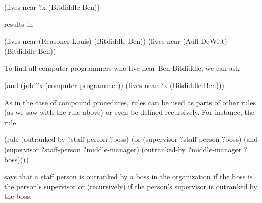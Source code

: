\begin{codeBlock}
(lives-near ?x (Bitdiddle Ben))
\end{codeBlock}

\noindent
results in

\begin{codeBlock}
(lives-near (Reasoner Louis) (Bitdiddle Ben))
(lives-near (Aull DeWitt) (Bitdiddle Ben))
\end{codeBlock}

\noindent
To find all computer programmers who live near Ben Bitdiddle, we can ask

\begin{codeBlock}
(and (job ?x (computer programmer))
     (lives-near ?x (Bitdiddle Ben)))
\end{codeBlock}

\noindent
As in the case of compound procedures, rules can be used as parts of other
rules (as we saw with the  rule above) or even be defined
recursively.  For instance, the rule

\begin{codeBlock}
(rule (outranked-by ?staff-person ?boss)
      (or (supervisor ?staff-person ?boss)
          (and (supervisor ?staff-person ?middle-manager)
               (outranked-by ?middle-manager ?boss))))
\end{codeBlock}

\noindent
says that a staff person is outranked by a boss in the organization if the boss
is the person's supervisor or (recursively) if the person's supervisor is
outranked by the boss.

